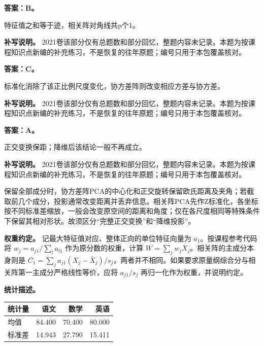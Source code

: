 
\textbf{答案：B。}

特征值之和等于迹，相关阵对角线共p个1。


\textbf{补写说明。} 2021卷该部分仅有总题数和部分回忆，整题内容未记录。本题为按课程知识点新编的补充练习，不是恢复的往年原题；编号只用于本包覆盖核对。



\textbf{答案：C。}

标准化消除了该正比例尺度变化，协方差阵则改变相应方差与协方差。


\textbf{补写说明。} 2021卷该部分仅有总题数和部分回忆，整题内容未记录。本题为按课程知识点新编的补充练习，不是恢复的往年原题；编号只用于本包覆盖核对。



\textbf{答案：A。}

正交变换保距；降维后该结论一般不再成立。


\textbf{补写说明。} 2021卷该部分仅有总题数和部分回忆，整题内容未记录。本题为按课程知识点新编的补充练习，不是恢复的往年原题；编号只用于本包覆盖核对。



保留全部成分时，协方差阵PCA的中心化和正交旋转保留欧氏距离及夹角；若截取前几个成分，投影通常改变距离并丢弃信息。相关阵PCA先作Z标准化，各坐标按不同标准差缩放，一般会改变原空间的距离和角度；仅在各尺度相同等特殊条件下保留其相对形状。故须区分``完整正交变换''和``降维投影''。



\textbf{权重约定。} 记最大特征值对应、整体正向的单位特征向量为 \(a_1\)。按课程参考代码将 \(w_j=a_{j1}/\sum_l a_{l1}\) 作为原分数的权重，计算 \(W=\sum_jw_jX_j\)。相关阵的主成分本身则是 \(C_1=\sum_ja_{j1}(X_j-\bar X_j)/s_j\)，两者并不相同。如果要求原量纲综合分与相关阵第一主成分严格线性等价，应将 \(a_{j1}/s_j\) 再归一化作为权重，并说明约定。

\textbf{统计描述。}

\begin{center}\small\setlength{\tabcolsep}{4pt}\renewcommand{\arraystretch}{1.18}\begin{tabular}{@{}lrrr@{}}
\toprule
统计量 & 语文 & 数学 & 英语 \\
\midrule

均值 & 84.400 & 70.400 & 80.000 \\
标准差 & 14.943 & 27.790 & 15.411 \\
\bottomrule\end{tabular}\end{center}

